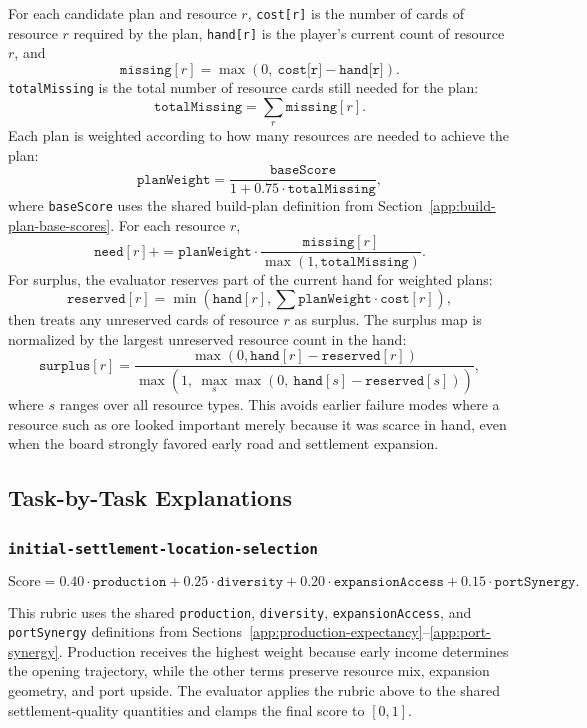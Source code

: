 \documentclass[letter,  12 pt]{article}
\begin{document}
For each candidate plan and resource $r$, \texttt{cost[r]} is the number of cards of resource $r$ required by the plan, \texttt{hand[r]} is the player's current count of resource $r$, and
\[
\texttt{missing}[r] = \max(0,\ \texttt{cost[r]} - \texttt{hand[r]}).
\]
\texttt{totalMissing} is the total number of resource cards still needed for the plan:
\[
\texttt{totalMissing} = \sum_r \texttt{missing}[r].
\]
Each plan is weighted according to how many resources are needed to achieve the plan:
\[
\texttt{planWeight} = \frac{\texttt{baseScore}}{1 + 0.75 \cdot \texttt{totalMissing}},
\]
where \texttt{baseScore} uses the shared build-plan definition from Section~\ref{app:build-plan-base-scores}.
For each resource $r$,
\[
\texttt{need}[r] {+}{=} \texttt{planWeight} \cdot \frac{\texttt{missing}[r]}{\max(1,\texttt{totalMissing})}.
\]
For surplus, the evaluator reserves part of the current hand for weighted plans:
\[
\texttt{reserved}[r] = \min(\texttt{hand}[r], \sum \texttt{planWeight} \cdot \texttt{cost}[r]),
\]
then treats any unreserved cards of resource $r$ as surplus. The surplus map is normalized by the largest unreserved resource count in the hand:
\[
\texttt{surplus}[r] =
\frac{\max(0, \texttt{hand}[r] - \texttt{reserved}[r])}
{\max(1,\ \max_s \max(0,\ \texttt{hand}[s] - \texttt{reserved}[s]))},
\]
where $s$ ranges over all resource types. This avoids earlier failure modes where a resource such as ore looked important merely because it was scarce in hand, even when the board strongly favored early road and settlement expansion.

\subsection{Task-by-Task Explanations}

\subsubsection{\texttt{initial-settlement-location-selection}}
\label{app:task-initial-settlement-location-selection}
\[
\text{Score} = 
0.40 \cdot \texttt{production} +
0.25 \cdot \texttt{diversity} +
0.20 \cdot \texttt{expansionAccess} +
0.15 \cdot \texttt{portSynergy}.
\]

This rubric uses the shared \texttt{production}, \texttt{diversity}, \texttt{expansionAccess}, and \texttt{portSynergy} definitions from Sections~\ref{app:production-expectancy}--\ref{app:port-synergy}. Production receives the highest weight because early income determines the opening trajectory, while the other terms preserve resource mix, expansion geometry, and port upside.
The evaluator applies the rubric above to the shared settlement-quality quantities and clamps the final score to $[0,1]$. 
\end{document}
